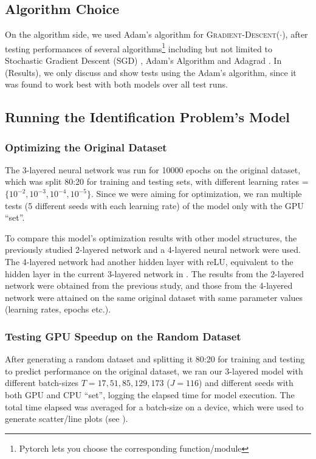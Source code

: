 \documentclass[12pt]{article}
\begin{document}
    \subsection{Algorithm Choice} \label{sec:Algorithm Choice}
    On the algorithm side, we used Adam's algorithm for \textsc{Gradient-Descent}($\cdot$), after testing performances of several algorithms\footnote{Pytorch lets you choose the corresponding function/module} including but not limited to Stochastic Gradient Descent (SGD) \cite{SGD}, Adam's Algorithm \cite{Adam} and Adagrad \cite{Adagrad}. In  (Results), we only discuss and show tests using the Adam's algorithm, since it was found to work best with both models over all test runs.
    
    \subsection{Running the Identification Problem's Model} \label{sec:Running the Identification Problem's Model}
    \subsubsection{Optimizing the Original Dataset} \label{sec:Identification Problem-Optimizing the Original Dataset}
    The 3-layered neural network was run for 10000 epochs on the original dataset, which was split 80:20 for training and testing sets, with different learning rates = $\{10^{-2}, 10^{-3}, 10^{-4}, 10^{-5}\}$. Since we were aiming for optimization, we ran multiple tests (5 different seeds with each learning rate) of the model only with the GPU ``set''.
    
    To compare this model's optimization results with other model structures, the previously studied 2-layered network \cite{Xue2016Avi2} and a 4-layered neural network were used. The 4-layered network had another hidden layer with reLU, equivalent to the hidden layer in the current 3-layered network in . The results from the 2-layered network were obtained from the previous study, and those from the 4-layered network were attained on the same original dataset with same parameter values (learning rates, epochs etc.).
    
    \subsubsection{Testing GPU Speedup on the Random Dataset} \label{sec:Identification Problem-Testing GPU Speedup on the Random Dataset}
    After generating a random dataset and splitting it 80:20 for training and testing to predict performance on the original dataset, we ran our 3-layered model with different batch-sizes $T = 17, 51, 85, 129, 173$ ($J = 116$) and different seeds with both GPU and CPU ``set'', logging the elapsed time for model execution. The total time elapsed was averaged for a batch-size on a device, which were used to generate scatter/line plots (see ).
    
\end{document}
